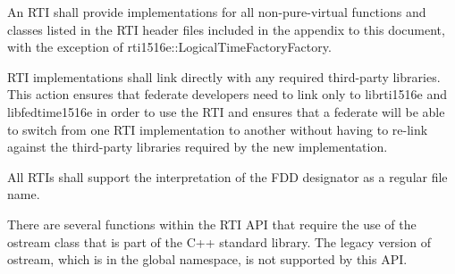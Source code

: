 \begin{compactstdpage}
    An RTI shall provide implementations for all non-pure-virtual functions and classes listed in the RTI header files included in the appendix to this document, with the exception of rti1516e::LogicalTimeFactoryFactory.

    RTI implementations shall link directly with any required third-party libraries. This action ensures that federate developers need to link only to librti1516e and libfedtime1516e in order to use the RTI and ensures that a federate will be able to switch from one RTI implementation to another without having to re-link against the third-party libraries required by the new implementation.

    All RTIs shall support the interpretation of the FDD designator as a regular file name.

    There are several functions within the RTI API that require the use of the ostream class that is part of the C++ standard library. The legacy version of ostream, which is in the global namespace, is not supported by this API.

\end{compactstdpage}

\clearpage

